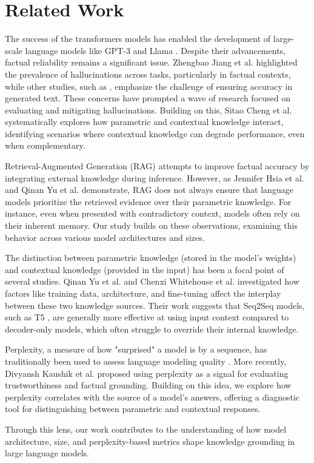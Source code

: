 \section{Related Work}

The success of the transformers models \cite{attention_is_all_you_need} has enabled the development of large-scale language models like GPT-3 \cite{gpt3} and Llama \cite{llama}.
Despite their advancements, factual reliability remains a significant issue.
Zhengbao Jiang et al.\cite{how_can_we_know} highlighted the prevalence of hallucinations across tasks, particularly in factual contexts, while other studies, such as \cite{can_rag_models_reason,gpt2}, emphasize the challenge of ensuring accuracy in generated text.
These concerns have prompted a wave of research focused on evaluating and mitigating hallucinations.
Building on this, Sitao Cheng et al.\cite{understanding_the_interplay} systematically explores how parametric and contextual knowledge interact, identifying scenarios where contextual knowledge can degrade performance, even when complementary.

Retrieval-Augmented Generation (RAG) \cite{rag,atlas_foundational,retro} attempts to improve factual accuracy by integrating external knowledge during inference.
However, as Jennifer Hsia et al.\cite{ragged} and Qinan Yu et al.\cite{factual_recall} demonstrate, RAG does not always ensure that language models prioritize the retrieved evidence over their parametric knowledge.
For instance, even when presented with contradictory context, models often rely on their inherent memory.
Our study builds on these observations, examining this behavior across various model architectures and sizes.

The distinction between parametric knowledge (stored in the model's weights) and contextual knowledge (provided in the input) has been a focal point of several studies.
Qinan Yu et al.\cite{factual_recall} and Chenxi Whitehouse et al.\cite{knowledge_grounding_retrieval_augmented} investigated how factors like training data, architecture, and fine-tuning affect the interplay between these two knowledge sources.
Their work suggests that Seq2Seq models, such as T5 \cite{t5,flant5}, are generally more effective at using input context compared to decoder-only models, which often struggle to override their internal knowledge.

Perplexity, a measure of how "surprised" a model is by a sequence, has traditionally been used to assess language modeling quality \cite{how_can_we_know}.
More recently, Divyansh Kaushik et al.\cite{learning_the_difference} proposed using perplexity as a signal for evaluating trustworthiness and factual grounding.
Building on this idea, we explore how perplexity correlates with the source of a model's answers, offering a diagnostic tool for distinguishing between parametric and contextual responses.

Through this lens, our work contributes to the understanding of how model architecture, size, and perplexity-based metrics shape knowledge grounding in large language models.

